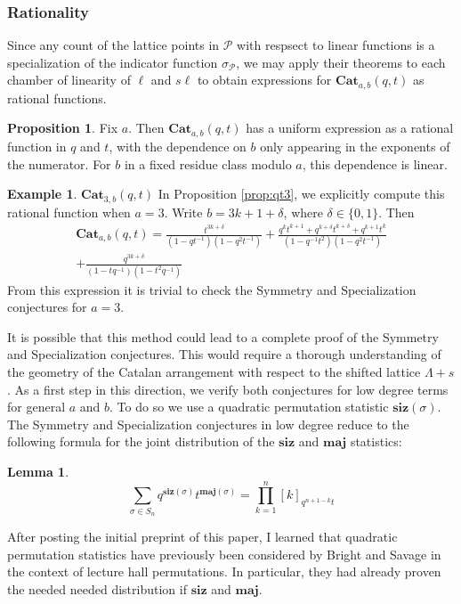 \documentclass{amsart}[12pt]
\theoremstyle{definition}
\newtheorem{lemma}[dummy]{Lemma}
\newtheorem{example}[dummy]{Example}
\newtheorem{proposition}[dummy]{Proposition}
\newcommand{\Cat}{\mathbf{Cat}}
\newcommand{\sk}{s\ell}
\newcommand{\maj}{\mathbf{maj}}
\newcommand{\siz}{\mathbf{siz}}
\begin{document}
\subsubsection{Rationality}
Since any count of the lattice points in $\mathcal{P}$ with respsect to linear functions is a specialization of the indicator function $\sigma_{\mathcal{P}}$, we may apply their theorems to each chamber of linearity of $\ell$ and $\sk$ to obtain expressions for $\Cat_{a,b}(q,t)$ as rational functions. 
\begin{proposition}
Fix $a$. Then $\Cat_{a,b}(q,t)$ has a uniform expression as a rational function in $q$ and $t$, with the dependence on $b$ only appearing in the exponents of the numerator. For $b$ in a fixed residue class modulo $a$, this dependence is linear.
\end{proposition}
\begin{example}{$\Cat_{3,b}(q,t)$}
In Proposition \ref{prop:qt3}, we explicitly compute this rational function when $a=3$. Write $b=3k+1+\delta$, where $\delta\in\{0,1\}$. Then
\begin{multline*}
\Cat_{a,b}(q,t)=\frac{t^{3k+\delta}}{(1-qt^{-1})(1-q^2t^{-1})} +\frac{q^kt^{k+1}+q^{k+\delta}t^{k+\delta}+q^{k+1}t^k}{(1-q^{-1}t^2)(1-q^2t^{-1})} \\+\frac{q^{3k+\delta}}{(1-tq^{-1})(1-t^2q^{-1})}
\end{multline*}
From this expression it is trivial to check the Symmetry and Specialization conjectures for $a=3$.
\end{example}
It is possible that this method could lead to a complete proof of the Symmetry and Specialization conjectures. This would require a thorough understanding of the geometry of the Catalan arrangement with respect to the shifted lattice $\Lambda+s$.
As a first step in this direction, we verify both conjectures for low degree terms for general $a$ and $b$. To do so we use a quadratic permutation statistic $\siz(\sigma)$. The Symmetry and Specialization conjectures in low degree reduce to the following formula for the joint distribution of the $\siz$ and $\maj$ statistics:
\begin{lemma}
$$\sum_{\sigma\in S_n} q^{\siz(\sigma)}t^{\maj(\sigma)}=\prod_{k=1}^n [k]_{q^{n+1-k}t}$$
\end{lemma}
After posting the initial preprint of this paper, I learned that quadratic permutation statistics have previously been considered by Bright and Savage \cite{BS} in the context of lecture hall permutations.  In particular, they had already proven the needed needed distribution if $\siz$ and $\maj$.
\end{document}
